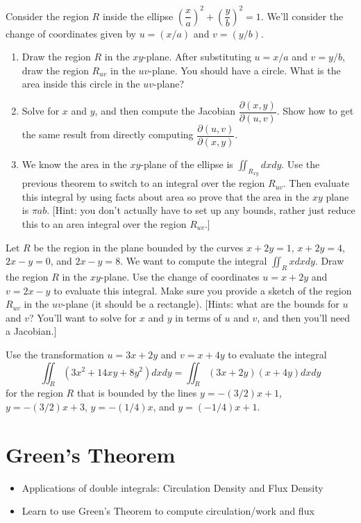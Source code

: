 \begin{problem}
 Consider the region $R$ inside the ellipse $\left(\dfrac{x}{a}\right)^2+\left(\dfrac{y}{b}\right)^2=1$.  We'll consider the change of coordinates given by $u=(x/a)$ and $v=(y/b)$.
\begin{enumerate}
 \item Draw the region $R$ in the $xy$-plane.  After substituting $u=x/a$ and $v=y/b$, draw the region $R_{uv}$ in the $uv$-plane.  You should have a circle.  What is the area inside this circle in the $uv$-plane?
 \item Solve for $x$ and $y$, and then compute the Jacobian  $\dfrac{\partial (x,y)}{\partial (u,v)}$. Show how to get the same result from directly computing $\dfrac{\partial (u,v)}{\partial (x,y)}$.
 \item We know the area in the $xy$-plane of the ellipse is $\iint_{R_{xy}} dxdy$. Use the previous theorem to switch to an integral over the region $R_{uv}$.  Then evaluate this integral by using facts about area so prove that the area in the $xy$ plane is $\pi a b$. [Hint: you don't actually have to set up any bounds, rather just reduce this to an area integral over the region $R_{uv}$.] 
\end{enumerate}

\end{problem}


\begin{problem}
Let $R$ be the region in the plane bounded by the curves $x+2y=1$, $x+2y=4$, $2x-y=0$, and $2x-y=8$.  We want to compute the integral $\iint_R xdxdy$. Draw the region $R$ in the $xy$-plane. Use the change of coordinates $u=x+2y$ and $v=2x-y$ to evaluate this integral. Make sure you provide a sketch of the region $R_{uv}$ in the $uv$-plane (it should be a rectangle).  
[Hints: what are the bounds for $u$ and $v$?  You'll want to solve for $x$ and $y$ in terms of $u$ and $v$, and then you'll need a Jacobian.]
\end{problem}


\begin{problem}
%
 Use the transformation $u=3x+2y$ and $v=x+4y$ to evaluate the integral $$\iint_R (3x^2+14xy+8y^2)dxdy =\iint_R (3x+2y)(x+4y)dxdy $$ for the region $R$ that is bounded by the lines $y=-(3/2)x+1$, $y=-(3/2)x+3$, $y=-(1/4)x$, and  $y=(-1/4)x+1$.
\end{problem}

\uday
\normalsize
\section{Green's Theorem}
\begin{itemize}
\item Applications of double integrals: Circulation Density and Flux Density
\item Learn to use Green's Theorem to compute circulation/work and flux
\end{itemize}

